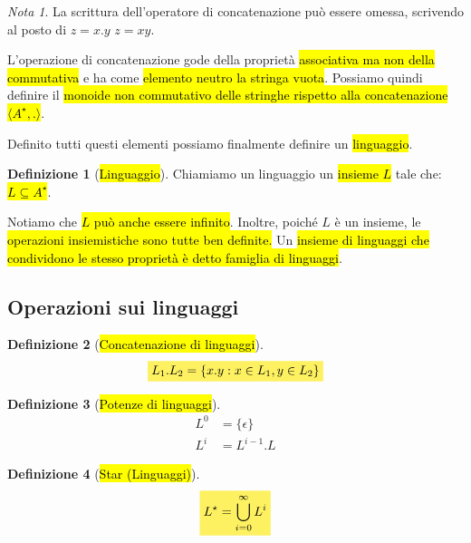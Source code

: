 \documentclass[a4paper,11pt,oneside]{article}
\theoremstyle{plain}
\theoremstyle{definition}
\newtheorem{defn}{Definizione}[section]
\theoremstyle{remark}
\newtheorem*{nota}{Nota}
\newcommand{\mhl}[1]{\colorbox{hlcolor}{$\displaystyle #1$}}
\begin{document}
\begin{nota}
  La scrittura dell'operatore di concatenazione può essere omessa, scrivendo al
  posto di $z = x.y$ $z = xy$.
\end{nota}

L'operazione di concatenazione gode della proprietà \hl{associativa ma non della
commutativa} e ha come \hl{elemento neutro la stringa vuota}. Possiamo quindi
definire il \hl{monoide non commutativo delle stringhe rispetto alla
concatenazione $\langle A^\star, . \rangle$}.

Definito tutti questi elementi possiamo finalmente definire un \hl{linguaggio}.

\begin{defn}[\hl{Linguaggio}]\label{def:linguaggio}
  Chiamiamo un linguaggio un \hl{insieme $L$} tale che:
  \hl{$L \subseteq A^\star$}.
\end{defn}

Notiamo che \hl{$L$ può anche essere infinito}. Inoltre, poiché $L$ è un
insieme, le \hl{operazioni insiemistiche sono tutte ben definite.} Un
\hl{insieme di linguaggi che condividono le stesso proprietà è detto famiglia di
linguaggi}.

\subsection{Operazioni sui linguaggi}

\begin{defn}[\hl{Concatenazione di linguaggi}]\label{def:concatenazione-ling}
  \begin{equation}
    \mhl{ L_1 . L_2 = \{ x.y : x \in L_1, y \in L_2 \} }
  \end{equation}
\end{defn}

\begin{defn}[\hl{Potenze di linguaggi}]\label{def:potenze-linguaggi}
  \begin{equation}
    \begin{aligned}
      L^0 & = \{\epsilon\} \\
      L^i & = L^{i-1}.L
    \end{aligned}
  \end{equation}
\end{defn}

\begin{defn}[\hl{Star (Linguaggi)}]\label{def:star-linguaggi}
  \begin{equation}
    \mhl{ L^\star = \bigcup^{\infty}_{i=0} L^i }
  \end{equation}
\end{defn}
\end{document}
